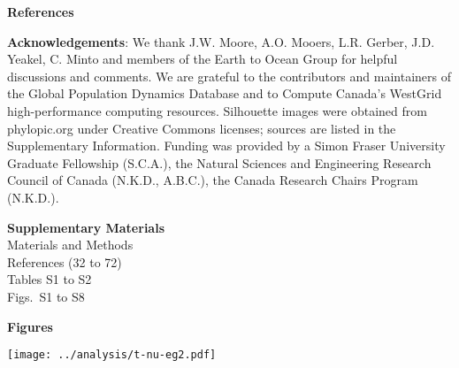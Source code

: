 \textbf{References}

\renewcommand{\section}[2]{}%



\textbf{Acknowledgements}: We thank J.W. Moore, A.O. Mooers, L.R. Gerber, J.D. Yeakel, C. Minto and members of the Earth to Ocean Group for helpful discussions and comments. We are grateful to the contributors and maintainers of the Global Population Dynamics Database and to Compute Canada's WestGrid high-performance computing resources. Silhouette images were obtained from phylopic.org under Creative Commons licenses; sources are listed in the Supplementary Information. Funding was provided by a Simon Fraser University Graduate Fellowship (S.C.A.), the Natural Sciences and Engineering Research Council of Canada (N.K.D., A.B.C.), the Canada Research Chairs Program (N.K.D.).

\textbf{Supplementary Materials}\\
Materials and Methods\\
References (32 to 72)\\
Tables S1 to S2\\
Figs.~S1 to S8\\



\clearpage

\textbf{Figures}

\begin{center}
\texttt{[image: ../analysis/t-nu-eg2.pdf]}
\end{center}

